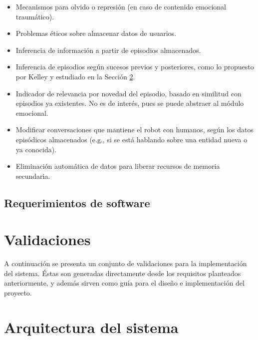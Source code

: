 \begin{itemize}
\item Mecanismos para olvido o represión (en caso de contenido emocional traumático).
\item Problemas éticos sobre almacenar datos de usuarios.
\item Inferencia de información a partir de episodios almacenados.
\item Inferencia de episodios según sucesos previos y posteriores, como lo propuesto por Kelley \cite{Kelley2014} y estudiado en la Sección \ref{}.
\item Indicador de relevancia por novedad del episodio, basado en similitud con episodios ya existentes. No es de interés, pues se puede abstraer al módulo emocional.
\item Modificar conversaciones que mantiene el robot con humanos, según los datos episódicos almacenados (e.g., si se está hablando sobre una entidad nueva o ya conocida).
\item Eliminación automática de datos para liberar recursos de memoria secundaria.
\end{itemize}



\subsection{Requerimientos de software}




\section{Validaciones}

A continuación se presenta un conjunto de validaciones para la implementación del sistema. Éstas son generadas directamente desde los requisitos planteados anteriormente, y además sirven como guía para el diseño e implementación del proyecto.


 
\section{Arquitectura del sistema}
 

